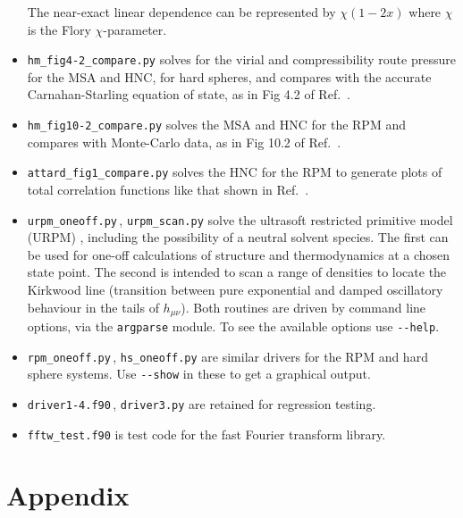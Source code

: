 \documentclass[12pt,a4paper]{article}
\newcommand{\Refcite}[1]{Ref.~\cite{#1}}
\begin{document}
\begin{itemize}
  The near-exact linear dependence can be represented by $\chi (1 -
  2x)$ where $\chi$ is the Flory $\chi$-parameter.
%
\item\verb+hm_fig4-2_compare.py+ solves for the virial and
  compressibility route pressure for the MSA and HNC, for hard
  spheres, and compares with the accurate Carnahan-Starling equation of
  state, as in Fig 4.2 of \Refcite{HM06}.  
%
\item\verb+hm_fig10-2_compare.py+ solves the MSA and HNC for the
  RPM and compares with Monte-Carlo data, as in Fig 10.2 of
  \Refcite{HM06}.
%
\item\verb+attard_fig1_compare.py+ solves the HNC for the RPM to
  generate plots of total correlation functions like that shown in
  \Refcite{Att93}.
%
\item\verb+urpm_oneoff.py+\,, \verb+urpm_scan.py+ solve the ultrasoft
  restricted primitive model (URPM) \cite{WVA+13}, including the
  possibility of a neutral solvent species.  The first can be
  used for one-off calculations of structure and thermodynamics at a
  chosen state point.  The second is intended to scan a range
  of densities to locate the Kirkwood line (transition between pure
  exponential and damped oscillatory behaviour in the tails of
  $h_{\mu\nu}$).  Both routines are driven by command line options,
  via the \verb+argparse+ module.  To see the available options use
  \verb+--help+.
%
\item\verb+rpm_oneoff.py+\,, \verb+hs_oneoff.py+ are similar drivers
  for the RPM and hard sphere systems.  Use \verb+--show+ in these to
  get a graphical output.
%
\item \verb+driver1-4.f90+\,, \verb+driver3.py+ are retained
  for regression testing.
%
\item \verb+fftw_test.f90+ is test code for the fast Fourier transform library.
%
\end{itemize}

\appendix
%
\section{Appendix}
%
\end{document}

